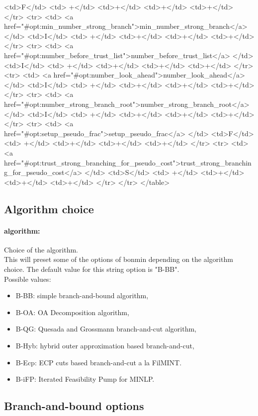 {{<td>F</td>
<td> +</td>
<td>+</td>
<td>+</td>
<td>+</td>
</tr>
<tr>
<td> <a href="#opt:min_number_strong_branch">min_number_strong_branch</a> </td>
<td>I</td>
<td> +</td>
<td>+</td>
<td>+</td>
<td>+</td>
</tr>
<tr>
<td> <a href="#opt:number_before_trust_list">number_before_trust_list</a> </td>
<td>I</td>
<td> +</td>
<td>+</td>
<td>+</td>
<td>+</td>
</tr>
<tr>
<td> <a href="#opt:number_look_ahead">number_look_ahead</a> </td>
<td>I</td>
<td> +</td>
<td>+</td>
<td>+</td>
<td>+</td>
</tr>
<tr>
<td> <a href="#opt:number_strong_branch_root">number_strong_branch_root</a> </td>
<td>I</td>
<td> +</td>
<td>+</td>
<td>+</td>
<td>+</td>
</tr>
<tr>
<td> <a href="#opt:setup_pseudo_frac">setup_pseudo_frac</a> </td>
<td>F</td>
<td> +</td>
<td>+</td>
<td>+</td>
<td>+</td>
</tr>
<tr>
<td> <a href="#opt:trust_strong_branching_for_pseudo_cost">trust_strong_branching_for_pseudo_cost</a> </td>
<td>S</td>
<td> +</td>
<td>+</td>
<td>+</td>
<td>+</td>
</tr>
</tr>
</table>
}
}
\subsection{Algorithm choice}
\label{sec:Algorithmchoice}
\paragraph{algorithm:}\label{opt:algorithm} Choice of the algorithm. \\
 This will preset some of the options of bonmin depending on the algorithm choice. The default value for this string option is "B-BB".
\\ 
Possible values:
\begin{itemize}
   \item B-BB: simple branch-and-bound algorithm,
   \item B-OA: OA Decomposition algorithm,
   \item B-QG: Quesada and Grossmann branch-and-cut algorithm,
   \item B-Hyb: hybrid outer approximation based branch-and-cut,
   \item B-Ecp: ECP cuts based branch-and-cut a la FilMINT.
   \item B-iFP: Iterated Feasibility Pump for MINLP.
\end{itemize}

\subsection{Branch-and-bound options}
\label{sec:Branch-and-boundoptions}
